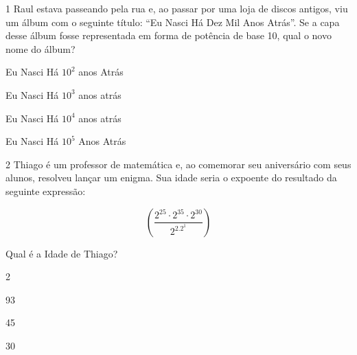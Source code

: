 \num{1} Raul estava passeando pela rua e, ao passar por uma loja de discos
antigos, viu um álbum com o seguinte título: ``Eu Nasci Há Dez Mil Anos
Atrás''. Se a capa desse álbum fosse representada em forma de potência
de base 10, qual o novo nome do álbum?

\begin{escolha}
\item Eu Nasci Há $10^2$ anos Atrás
\item Eu Nasci Há $10^3$ anos atrás
\item Eu Nasci Há $10^4$ anos atrás
\item Eu Nasci Há $10^5$ Anos Atrás
\end{escolha}









\num{2} Thiago é um professor de matemática e, ao comemorar seu aniversário
com seus alunos, resolveu lançar um enigma. Sua idade seria o expoente
do resultado da seguinte expressão:

$$(\frac{2^{25} \cdot 2^{35} \cdot 2^{30}} {2^2.2^1})$$

Qual é a Idade de Thiago?

\begin{escolha}
\item 2
\item 93
\item 45
\item 30
\end{escolha}



